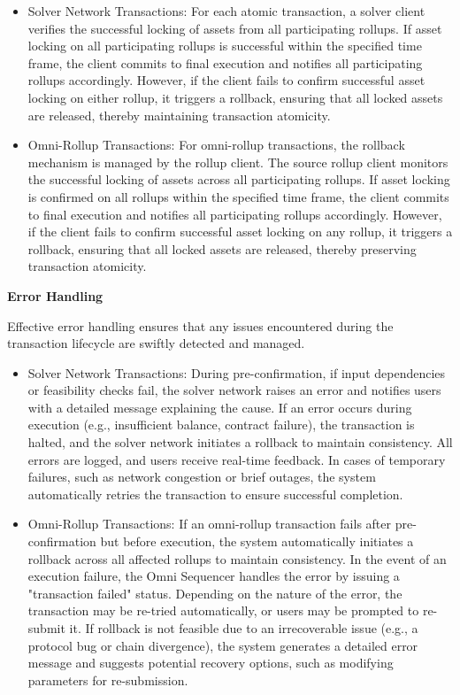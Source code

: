 \begin{itemize}
    \item Solver Network Transactions: For each atomic transaction, a solver client verifies the successful locking of assets from all participating rollups. If asset locking on all participating rollups is successful within the specified time frame, the client commits to final execution and notifies all participating rollups accordingly. However, if the client fails to confirm successful asset locking on either rollup, it triggers a rollback, ensuring that all locked assets are released, thereby maintaining transaction atomicity.

    \item Omni-Rollup Transactions: For omni-rollup transactions, the rollback mechanism is managed by the rollup client. The source rollup client monitors the successful locking of assets across all participating rollups. If asset locking is confirmed on all rollups within the specified time frame, the client commits to final execution and notifies all participating rollups accordingly. However, if the client fails to confirm successful asset locking on any rollup, it triggers a rollback, ensuring that all locked assets are released, thereby preserving transaction atomicity.
\end{itemize}


\textbf{Error Handling}

Effective error handling ensures that any issues encountered during the transaction lifecycle are swiftly detected and managed.
\begin{itemize}
    \item Solver Network Transactions: During pre-confirmation, if input dependencies or feasibility checks fail, the solver network raises an error and notifies users with a detailed message explaining the cause. If an error occurs during execution (e.g., insufficient balance, contract failure), the transaction is halted, and the solver network initiates a rollback to maintain consistency. All errors are logged, and users receive real-time feedback. In cases of temporary failures, such as network congestion or brief outages, the system automatically retries the transaction to ensure successful completion.

    \item Omni-Rollup Transactions: If an omni-rollup transaction fails after pre-confirmation but before execution, the system automatically initiates a rollback across all affected rollups to maintain consistency. In the event of an execution failure, the Omni Sequencer handles the error by issuing a "transaction failed" status. Depending on the nature of the error, the transaction may be re-tried automatically, or users may be prompted to re-submit it. If rollback is not feasible due to an irrecoverable issue (e.g., a protocol bug or chain divergence), the system generates a detailed error message and suggests potential recovery options, such as modifying parameters for re-submission.
\end{itemize}


